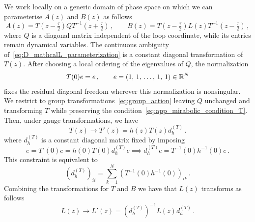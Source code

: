 We work locally on a generic domain of phase space on which we can parameterise $A(z)$ and $B(z)$ as follows
\begin{equation}
\label{eq:D_mathcalL_parameterization}
A(z) = T(z-\tfrac{\tau}{2}) Q T^{-1}(z+\tfrac{\tau}{2}) \,, \qquad B(z) = T(z-\tfrac{\tau}{2}) L(z) T^{-1}(z-\tfrac{\tau}{2}) \,,
\end{equation}
where $Q$ is a diagonal matrix independent of the loop coordinate, while its entries remain dynamical variables. 
The continuous ambiguity of~\eqref{eq:D_mathcalL_parameterization} is a constant diagonal transformation of $T(z)$. After choosing a local ordering of the eigenvalues of $Q$, the normalization
\begin{equation}
\label{eq:app_mirabolic_condition_T}
T(0) e =e \,, \qquad e=(1, \,1, \, \dots, \,1,\, 1) \in \mathbb{R}^N
\end{equation}
fixes the residual diagonal freedom wherever this normalization is nonsingular.
We restrict to group transformations~\eqref{eq:group_action} leaving $Q$ unchanged and transforming $T$ while preserving the condition~\eqref{eq:app_mirabolic_condition_T}.
Then, under gauge transformations, we have
\begin{equation}
T(z) \to T'(z)=h(z) T(z) d^{(T)}_h \,.
\end{equation}
where $d^{(T)}_h$ is a constant diagonal matrix fixed by imposing
\begin{equation}
  e=T'(0) e=   h(0) T(0) d^{(T)}_h e \implies d^{(T)}_h e = T^{-1}(0) h^{-1}(0) e \,.
\end{equation}
This constraint is equivalent to
\begin{equation}
(d^{(T)}_h)_{ii} = \sum^N_{k=1} (T^{-1}(0) h^{-1}(0))_{ik}\,.
\end{equation}
Combining the transformations for $T$ and $B$ we have that $L(z)$ transforms as follows
\begin{equation}
\label{eq:app_gauge_tr_L}
L(z) \to L'(z)= (d_h^{(T)})^{-1} L(z) d_h^{(T)} \,.
\end{equation}

